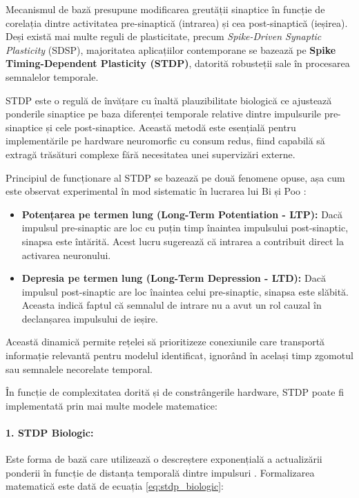 Mecanismul de bază presupune modificarea greutății sinaptice în funcție de co\-re\-la\-ți\-a dintre activitatea pre-sinaptică (intrarea) și cea post-sinaptică (ieșirea). Deși există mai multe reguli de plasticitate, precum \textit{Spike-Driven Synaptic Plasticity} (SDSP), majoritatea aplicațiilor contemporane se bazează pe \textbf{Spike Timing-Dependent Plasticity (STDP)}, datorită robusteții sale în procesarea semnalelor temporale.

STDP este o regulă de învățare cu înaltă plauzibilitate biologică \cite{song2000competitive} ce ajustează ponderile sinaptice pe baza diferenței temporale relative dintre impulsurile pre-sinaptice și cele post-sinaptice. Această metodă este esențială pentru implementările pe hardware neuromorfic cu consum redus, fiind capabilă să extragă trăsături complexe fără necesitatea unei supervizări externe.

Principiul de funcționare al STDP se bazează pe două fenomene opuse, așa cum este observat experimental în mod sistematic în lucrarea lui Bi și Poo \cite{bi1998synaptic}:
\begin{itemize}
    \item \textbf{Potențarea pe termen lung (Long-Term Potentiation - LTP):} Dacă impulsul pre-sinaptic are loc cu puțin timp înaintea impulsului post-sinaptic, sinapsa este întărită. Acest lucru sugerează că intrarea a contribuit direct la activarea neuronului.
    \item \textbf{Depresia pe termen lung (Long-Term Depression - LTD):} Dacă impulsul post-sinaptic are loc înaintea celui pre-sinaptic, sinapsa este slăbită. Aceasta indică faptul că semnalul de intrare nu a avut un rol cauzal în declanșarea impulsului de ieșire.
\end{itemize}

Această dinamică permite rețelei să prioritizeze conexiunile care transportă in\-for\-ma\-ți\-e relevantă pentru modelul identificat, ignorând în același timp zgomotul sau semnalele necorelate temporal.

În funcție de complexitatea dorită și de constrângerile hardware, STDP poate fi implementată prin mai multe modele matematice:

\paragraph{1. STDP Biologic:}
Este forma de bază care utilizează o descreștere exponențială a actualizării ponderii în funcție de distanța temporală dintre impulsuri \cite{bi1998synaptic}. Formalizarea matematică este dată de ecuația \eqref{eq:stdp_biologic}:

